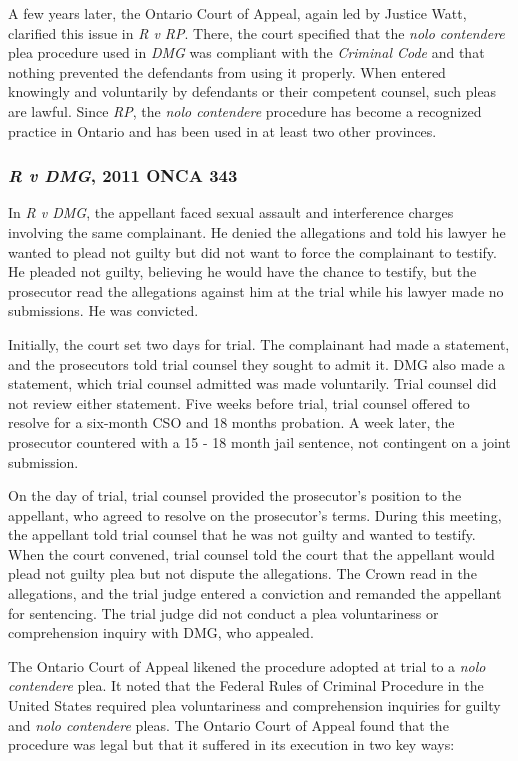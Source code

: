 A few years later, the Ontario Court of Appeal, again led by Justice Watt, clarified this issue in \textit{R v RP}. There, the court specified that the \textit{nolo contendere} plea procedure used in \textit{DMG} was compliant with the \textit{Criminal Code} and that nothing prevented the defendants from using it properly. When entered knowingly and voluntarily by defendants or their competent counsel, such pleas are lawful. Since \textit{RP}, the \textit{nolo contendere} procedure has become a recognized practice in Ontario and has been used in at least two other provinces.

\subsubsection{\textit{R v DMG}, 2011 ONCA 343}

In \textit{R v DMG}, the appellant faced sexual assault and interference charges involving the same complainant. He denied the allegations and told his lawyer he wanted to plead not guilty but did not want to force the complainant to testify. He pleaded not guilty, believing he would have the chance to testify, but the prosecutor read the allegations against him at the trial while his lawyer made no submissions. He was convicted.

Initially, the court set two days for trial. The complainant had made a statement, and the prosecutors told trial counsel they sought to admit it. DMG also made a statement, which trial counsel admitted was made voluntarily. Trial counsel did not review either statement. Five weeks before trial, trial counsel offered to resolve for a six-month CSO and 18 months probation. A week later, the prosecutor countered with a 15 - 18 month jail sentence, not contingent on a joint submission. 

On the day of trial, trial counsel provided the prosecutor's position to the appellant, who agreed to resolve on the prosecutor's terms. During this meeting, the appellant told trial counsel that he was not guilty and wanted to testify. When the court convened, trial counsel told the court that the appellant would plead not guilty plea but not dispute the allegations. The Crown read in the allegations, and the trial judge entered a conviction and remanded the appellant for sentencing. The trial judge did not conduct a plea voluntariness or comprehension inquiry with DMG, who appealed.

The Ontario Court of Appeal likened the procedure adopted at trial to a \textit{nolo contendere} plea. It noted that the Federal Rules of Criminal Procedure in the United States required plea voluntariness and comprehension inquiries for guilty and \textit{nolo contendere} pleas. The Ontario Court of Appeal found that the procedure was legal but that it suffered in its execution in two key ways:

